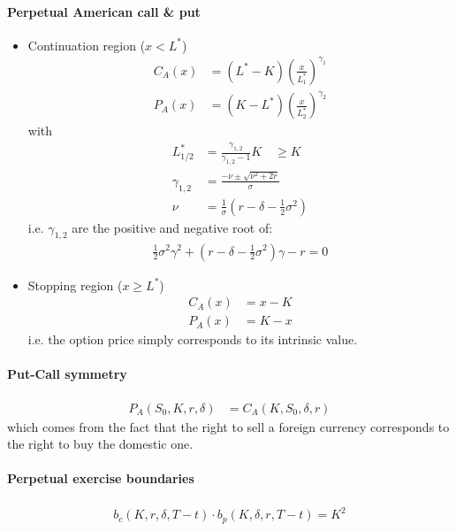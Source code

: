 \documentclass[a4paper,landscape,8pt,fleqn]{scrartcl}
\begin{document}
\begin{multicols*}{4}
\paragraph{Perpetual American call \& put}
\begin{itemize}
\item Continuation region ($x < L^\ast$)
\begin{align*}
C_A(x) &= (L^\ast - K) \left( \frac{x}{L_1^\ast} \right)^{\gamma_1} \\
P_A(x) &= (K - L^\ast) \left( \frac{x}{L_2^\ast} \right)^{\gamma_2}
\end{align*}
with
\begin{align*}
L_{1/2}^\ast &= \frac{\gamma_{1,2}}{\gamma_{1,2} - 1} K \quad \geq K \\
\gamma_{1,2} &= \frac{-\nu \pm \sqrt{\nu^2 + 2r}}{\sigma} \\
 \nu &= \frac{1}{\sigma} \left( r  -\delta - \frac{1}{2} \sigma^2 \right)
\end{align*}
i.e. $\gamma_{1,2}$ are the positive and negative root of:
\begin{align*}
\frac{1}{2} \sigma^2 \gamma^2 + \left( r - \delta - \frac{1}{2} \sigma^2 \right) \gamma - r = 0
\end{align*}
\item Stopping region ($x \geq L^\ast$)
\begin{align*}
C_A(x) &= x-K \\
P_A(x) &= K-x
\end{align*}
i.e. the option price simply corresponds to its intrinsic value.
\end{itemize}

\paragraph{Put-Call symmetry}
\begin{align*}
P_A(S_0,K,r,\delta) &= C_A(K,S_0,\delta,r)
\end{align*}
which comes from the fact that the right to sell a foreign currency corresponds to the right to buy the domestic one.

\paragraph{Perpetual exercise boundaries}
\begin{align*}
b_c(K,r,\delta,T-t) \cdot b_p(K,\delta,r,T-t) = K^2
\end{align*}


\end{multicols*}
\end{document}
